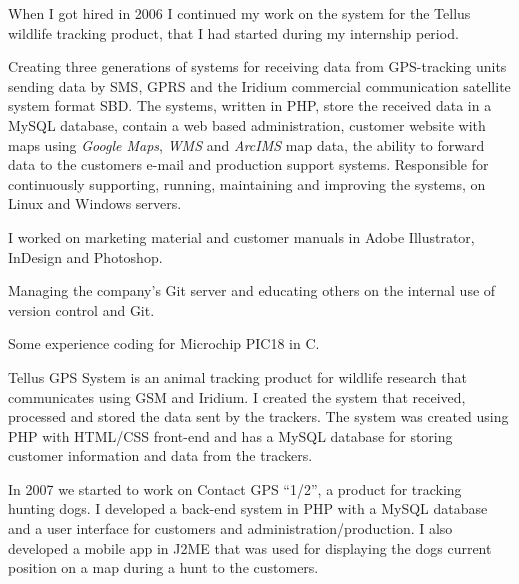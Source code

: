 \documentclass{cv-stylish}
\begin{document}
\begin{center}
\begin{adjustwidth}{0.015\linewidth}{0.015\linewidth}
When I got hired in 2006 I continued my work on the system for the
Tellus wildlife tracking product, that I had started during my
internship period.

\begin{compactitem}
  \item Creating three generations of systems for receiving data from
    GPS-tracking units sending data by SMS, GPRS and the Iridium
    commercial communication satellite system format SBD.
    The systems, written in PHP, store the received data in a MySQL
    database, contain a web based administration, customer website
    with maps using \emph{Google Maps}, \emph{WMS} and \emph{ArcIMS} map data, the ability to forward
    data to the customers e-mail and production support
    systems. Responsible for continuously supporting, running,
    maintaining and improving the systems, on Linux and Windows
    servers.
  \item I worked on marketing material and customer manuals in Adobe
    Illustrator, InDesign and Photoshop.
  \item Managing the company's Git server and educating others on the
    internal use of version control and Git.
  \item Some experience coding for Microchip PIC18 in C.
\end{compactitem}

Tellus GPS System is an animal tracking product for wildlife research
that communicates using GSM and Iridium. I created the system that
received, processed and stored the data sent by the trackers. The
system was created using PHP with HTML/CSS front-end and has
a MySQL database for storing customer information and data from the
trackers.

In 2007 we started to work on Contact GPS ``1/2'', a product for tracking
hunting dogs. I developed a back-end system in PHP with a MySQL
database and a user interface for customers and
administration/production.
I also developed a mobile app in J2ME that was used for displaying the
dogs current position on a map during a hunt to the customers.

\end{adjustwidth}




\end{center}
\end{document}
